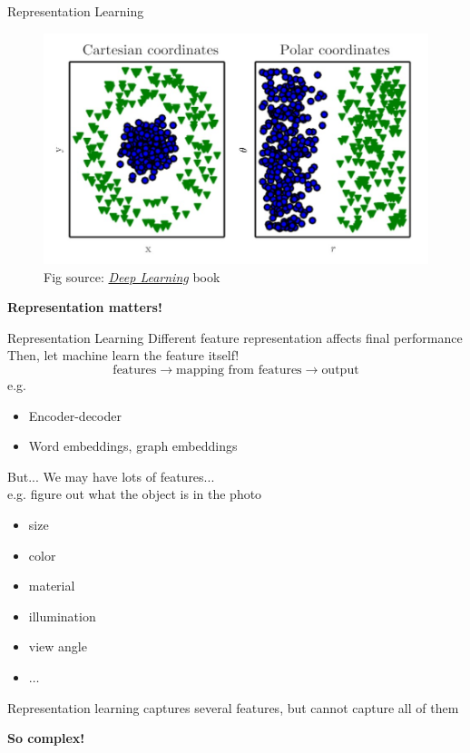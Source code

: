 \documentclass{../TexTemplate/myslide}
\begin{document}
\begin{frame}{Representation Learning}
\begin{figure}
\centering
\includegraphics[width=0.8\linewidth]{fig/representation.jpg}
\caption*{\scriptsize Fig source: \href{https://www.deeplearningbook.org/contents/intro.html}{\emph{Deep Learning}} book}
\end{figure}
\textbf{Representation matters!}
\end{frame}

\begin{frame}{Representation Learning}
Different feature representation affects final performance
\\\bigskip\pause
Then, let machine learn the feature itself!
\[\text{features}\to\text{mapping from features}\to\text{output}\]
e.g.
\begin{itemize}
	\item Encoder-decoder
	\item Word embeddings, graph embeddings
\end{itemize}
\end{frame}

\begin{frame}{But...}
We may have lots of features...\\
e.g. figure out what the object is in the photo
\begin{itemize}
	\item size
	\item color
	\item material
	\item illumination
	\item view angle
	\item $\ldots$
\end{itemize}
Representation learning captures several features, but cannot capture all of them
\pause
\begin{center}
\textbf{So complex!}
\end{center}
\end{frame}
\end{document}
